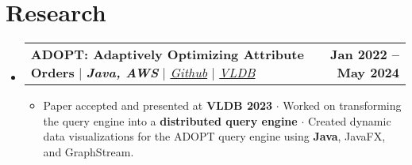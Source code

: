 \documentclass[letterpaper,11pt]{article}
\makeatletter
\newcommand{\resumeItem}[1]{
  \item\small{
    {#1 \vspace{-2pt}}
  }
}
\newcommand{\resumeProjectHeading}[2]{
    \item
    \begin{tabular*}{1.001\textwidth}{l@{\extracolsep{\fill}}r}
      \small#1 & \textbf{\small #2}\\
    \end{tabular*}\vspace{-7pt}
}
\newcommand{\resumeSubHeadingListStart}{\begin{itemize}[leftmargin=0.0in, label={}]}
\newcommand{\resumeSubHeadingListEnd}{\end{itemize}}
\newcommand{\resumeItemListStart}{\begin{itemize}}
\newcommand{\resumeItemListEnd}{\end{itemize}\vspace{-5pt}}
\makeatother
\begin{document}
\section{\textcolor{customred}{Research}}
  \vspace{-6pt}
      \resumeSubHeadingListStart
      \resumeProjectHeading
      {\textbf{ADOPT: Adaptively Optimizing Attribute Orders} $|$
      \textbf{\emph{Java, AWS}} $|$
      \emph{\href{https://github.com/jxiw/ADOPT}{Github}} $|$
      \emph{\href{https://vldb.org/2023/?papers-demo}{VLDB}}}{Jan 2022 -- May 2024}
      \resumeItemListStart
              \resumeItem{Paper accepted and presented at \textbf{VLDB 2023} $\cdot$ Worked
              on transforming the query engine into a \textbf{distributed query engine} $\cdot$ Created dynamic data 
              visualizations for the ADOPT query engine using \textbf{Java}, JavaFX, and GraphStream.}
            \resumeItemListEnd
      \resumeSubHeadingListEnd
  \vspace{-16pt}

\end{document}
